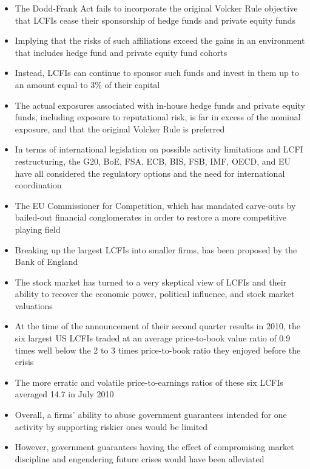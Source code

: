\documentclass[11pt]{beamer}
\begin{document}
\begin{frame}
\begin{itemize}
\item The Dodd-Frank Act fails to incorporate the original Volcker Rule objective that LCFIs cease their sponsorship of hedge funds and private equity funds
\item Implying that the risks of such affiliations exceed the gains in an environment that includes hedge fund and private equity fund cohorts
\item Instead, LCFIs can continue to sponsor such funds and invest in them up to an amount equal to 3\% of their capital
\item The actual exposures associated with in-house
hedge funds and private equity funds, including exposure to reputational risk, is far in excess of the nominal exposure, and that the original Volcker Rule is preferred
\item In terms of international legislation on possible activity limitations and LCFI restructuring, the G20, BoE, FSA, ECB, BIS, FSB, IMF, OECD, and EU have all considered the regulatory options and the need for international coordination
\end{itemize}
\end{frame}

\begin{frame}
\begin{itemize}
\item The EU Commissioner for Competition, which has mandated carve-outs by bailed-out financial conglomerates in order to restore a more competitive playing field
\item Breaking up the largest LCFIs into smaller firms, has been proposed by the Bank of England
\item The stock market has turned to a very skeptical view of LCFIs and
their ability to recover the economic power, political influence, and stock market valuations
\item At the time of the announcement of their second quarter results in 2010, the six largest US LCFIs traded at an average price-to-book value ratio of 0.9 times well below the 2 to 3 times price-to-book ratio they enjoyed before the crisis
\item The more erratic and volatile price-to-earnings ratios of these six LCFIs averaged 14.7 in July 2010
\item Overall, a firms’ ability to abuse government guarantees intended for one activity by supporting riskier ones would be limited
\item However, government guarantees having the effect of compromising market discipline and engendering future crises would have been alleviated
\end{itemize}
\end{frame}
\end{document}

